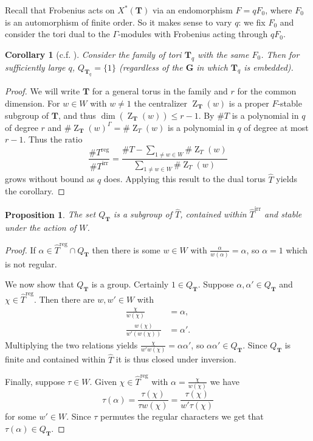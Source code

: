 \documentclass[11pt]{amsart}
\theoremstyle{plain}
\newtheorem{proposition}[theorem]{Proposition}
\newtheorem*{corollary}{Corollary}
\theoremstyle{definition}
\DeclareMathOperator{\Z}{Z}
\newcommand{\T}{\mathbf{T}}
\newcommand{\G}{\mathbf{G}}
\newcommand{\Galk}{\Gamma}
\newcommand{\hatT}{\hat{T}}
\newcommand{\Treg}{T^{\operatorname{reg}}}
\newcommand{\Threg}{\hatT^{\operatorname{reg}}}
\newcommand{\Tirr}{T^{\operatorname{irr}}}
\newcommand{\Thirr}{\hatT^{\operatorname{irr}}}
\begin{document}
Recall that Frobenius acts on $X^*(\T)$ via an endomorphism $F = qF_0$, where $F_0$ is an automorphism of finite order.  So it makes sense to vary $q$: we fix $F_0$ and consider the tori dual to the $\Galk$-modules with Frobenius acting through $qF_0$.

\begin{corollary}[{c.f. \cite[Lemma 8.4.2]{carter}}]
Consider the family of tori $\T_q$ with the same $F_0$.  Then for sufficiently large $q$, $Q_{\T_q} = \{ 1 \}$ (regardless of the $\G$ in which $\T_q$ is embedded).
\end{corollary}
\begin{proof}
We will write $\T$ for a general torus in the family and $r$ for the common dimension.  For $w \in W$ with $w \ne 1$ the centralizer $\Z_{\T}(w)$ is a proper $F$-stable subgroup of $\T$, and thus $\dim(\Z_{\T}(w)) \le r - 1$.  By \cite[3.3.5]{carter} $\# T$ is a polynomial in $q$ of degree $r$ and $\# \Z_{\T}(w)^\Galk = \# \Z_T(w)$ is a polynomial in $q$ of degree at most $r-1$.  Thus the ratio
$$\frac{\# \Treg}{\# \Tirr} = \frac{\# T - \sum_{1 \ne w \in W} \# \Z_T(w)}{\sum_{1 \ne w \in W} \# \Z_T(w)}$$
grows without bound as $q$ does.  Applying this result to the dual torus $\hatT$ yields the corollary.
\end{proof}

\begin{proposition} \label{irr-sub}
The set $Q_{\T}$ is a subgroup of $\hatT$, contained within $\Thirr$ and stable under the action of $W$.
\end{proposition}
\begin{proof}
If $\alpha \in \Threg \cap Q_{\T}$ then there is some $w \in W$ with $\frac{\alpha}{w(\alpha)} = \alpha$, so $\alpha = 1$ which is not regular.

We now show that $Q_{\T}$ is a group.  Certainly $1 \in Q_{\T}$.  Suppose $\alpha, \alpha' \in Q_{\T}$ and $\chi \in \Threg$.  Then there are $w, w' \in W$ with
\begin{align*}
\frac{\chi}{w(\chi)} &= \alpha, \\
\frac{w(\chi)}{w'(w(\chi))} &= \alpha'.
\end{align*}
Multiplying the two relations yields $\frac{\chi}{w'w(\chi)} = \alpha\alpha'$, so $\alpha\alpha' \in Q_{\T}$.  Since $Q_{\T}$ is finite and contained within $\hatT$ it is thus closed under inversion.

Finally, suppose $\tau \in W$.  Given $\chi \in \Threg$ with $\alpha = \frac{\chi}{w(\chi)}$ we have
$$\tau(\alpha) = \frac{\tau(\chi)}{\tau w(\chi)} = \frac{\tau(\chi)}{w' \tau(\chi)}$$
for some $w' \in W$.  Since $\tau$ permutes the regular characters we get that $\tau(\alpha) \in Q_{\T}$.
\end{proof}
\end{document}
